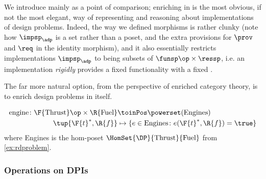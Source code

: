 We introduce \DPI mainly as a point of comparison; enriching in \Set is the most obvious, if not the most elegant, way of representing and reasoning about implementations of design problems. Indeed, the way we defined morphisms is rather clunky (note how $\impsp_\adp$ is a set rather than a poset, and the extra provisions for $\prov$ and $\req$ in the identity morphism), and it also essentially restricts implementations $\impsp_\adp$ to being subsets of $\funsp\op \times \ressp$, i.e. an implementation \emph{rigidly} provides a fixed functionality \fun with a fixed \res.

The far more natural option, from the perspective of enriched category theory, is to enrich design problems in \DP itself.

\begin{example}
  \begin{equation}
    \begin{aligned}
      \text{engine} \colon \F{\text{Thrust}}\op \times \R{\text{Fuel}} &\toinPos \powerset(\text{Engines}) \\
      \tup{\F{t}^*,\R{f}} &\mapsto \{ e \in \text{Engines} \colon e(\F{t}^*, \R{f}) = \true \}
    \end{aligned}
  \end{equation}
  where Engines is the hom-poset $\HomSet{\DP}{\text{Thrust}}{\text{Fuel}}$ from \cref{ex:rdproblem}.
\end{example}

\subsubsection{Operations on DPIs}




